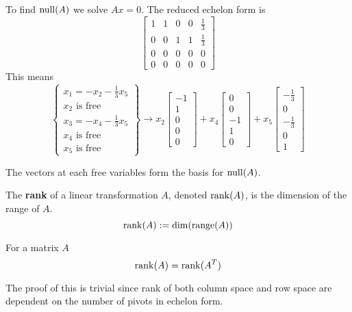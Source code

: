 To find $\operatorname{null}(A)$ we solve $Ax = 0$. The reduced echelon form is 
$$\begin{bmatrix}
1 & 1 & 0 & 0 & \frac{1}{3} \\
0 & 0 & 1 & 1 & \frac{1}{3} \\
0 & 0 & 0 & 0 & 0 \\
0 & 0 & 0 & 0 & 0
\end{bmatrix}$$
This means 
$$ \left\{ \begin{matrix}
x_{1} = -x_{2} - \frac{1}{3} x_{5} \\
x_{2} \text{ is free} \\
x_{3} = -x_{4} - \frac{1}{3} x_{5} \\
x_{4} \text{ is free} \\
x_{5} \text{ is free}
\end{matrix} \right\} \longrightarrow x_{2} \begin{bmatrix}
-1 \\
1 \\ 
0 \\
0 \\
0
\end{bmatrix} + x_{4} \begin{bmatrix}
0 \\ 
0 \\
-1 \\
1 \\
0
\end{bmatrix} + x_{5} \begin{bmatrix}
-\frac{1}{3} \\
0 \\
-\frac{1}{3} \\
0 \\
1
\end{bmatrix}$$

The vectors at each free variables form the basis for $\operatorname{null}(A)$. 

\begin{definition}
The \textbf{rank} of a linear transformation $A$, denoted $\operatorname{rank}(A)$, is the dimension of the range of $A$. 
$$\operatorname{rank}(A) := \operatorname{dim}(\operatorname{range}(A))$$
\end{definition}

\begin{theorem}
For a matrix $A$ 
$$\operatorname{rank}(A) = \operatorname{rank}(A^{T})$$

The proof of this is trivial since rank of both column space and row space are dependent on the number of pivots in echelon form. 
\end{theorem}

